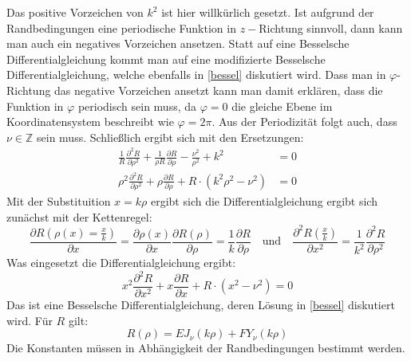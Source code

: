    Das positive Vorzeichen von $k^2$ ist hier willkürlich gesetzt. Ist aufgrund der Randbedingungen eine periodische Funktion in $z-$Richtung sinnvoll, dann kann man auch ein negatives Vorzeichen ansetzen. Statt auf eine Besselsche Differentialgleichung kommt man auf eine modifizierte Besselsche Differentialgleichung, welche ebenfalls in \ref{bessel} diskutiert wird. Dass man in $\varphi$-Richtung das negative Vorzeichen ansetzt kann man damit erklären, dass die Funktion in $\varphi$ periodisch sein muss, da $\varphi=0$ die gleiche Ebene im Koordinatensystem beschreibt wie $\varphi=2\pi$. Aus der Periodizität folgt auch, dass $\nu\in\mathbb{Z}$ sein muss. Schließlich ergibt sich mit den Ersetzungen:
   \begin{equation}\begin{split}
   		\frac{1}{R} \frac{\partial^2 R}{\partial \rho^2} + \frac{1}{\rho R} \frac{\partial R}{\partial \rho} - \frac{\nu^2}{\rho^2} + k^2 &= 0\\
   		\rho^2 \frac{\partial^2 R}{\partial \rho^2} + \rho \frac{\partial R}{\partial \rho}   + R\cdot (k^2 \rho^2 - \nu^2 )&= 0
   \end{split}\end{equation}
   Mit der Substituition $x=k\rho$ ergibt sich die Differentialgleichung ergibt sich zunächst mit der Kettenregel:
   \begin{equation}
   	\frac{\partial R(\rho(x)=\frac{x}{k})}{\partial x}=\frac{\partial \rho(x)}{\partial x} \frac{\partial R(\rho)}{\partial \rho}=\frac{1}{k} \frac{\partial R}{\partial \rho} \quad \text{und} \quad \frac{\partial^2 R(\frac{x}{k})}{\partial x^2} = \frac{1}{k^2} \frac{\partial^2 R}{\partial \rho^2}
   \end{equation}
   Was eingesetzt die Differentialgleichung ergibt:
   \begin{equation}
   	x^2 \frac{\partial^2 R}{\partial x^2} + x \frac{\partial R}{\partial x} + R\cdot (x^2 - \nu^2) = 0
   \end{equation}
   Das ist eine Besselsche Differentialgleichung, deren Lösung in \ref{bessel} diskutiert wird. Für $R$ gilt:
   \begin{equation}
   	R(\rho) = EJ_\nu(k\rho) + F Y_\nu(k\rho)
   \end{equation}
   Die Konstanten müssen in Abhängigkeit der Randbedingungen bestimmt werden.
